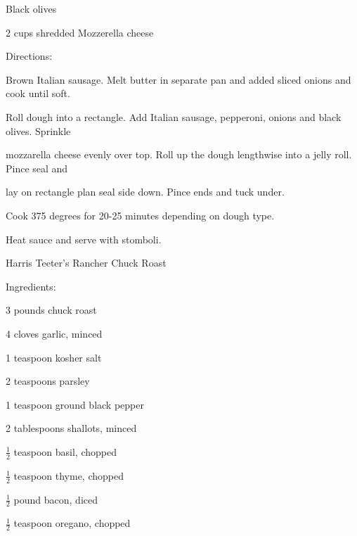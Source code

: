 \documentclass[a4paper,portrait,12pt]{book}
\begin{document}
Black olives




2 cups shredded Mozzerella cheese




Directions:




Brown Italian sausage. Melt butter in separate pan and added sliced onions and cook until soft.




Roll dough into a rectangle. Add Italian sausage, pepperoni, onions and black olives. Sprinkle




mozzarella cheese evenly over top. Roll up the dough lengthwise into a jelly roll. Pince seal and




lay on rectangle plan seal side down. Pince ends and tuck under.




Cook 375 degrees for 20-25 minutes depending on dough type.




Heat sauce and serve with stomboli.






\newpage
Harris Teeter's Rancher Chuck Roast




Ingredients:




3 pounds chuck roast




4 cloves garlic, minced




1 teaspoon kosher salt




2 teaspoons parsley




1 teaspoon ground black pepper




2 tablespoons shallots, minced




$\frac{1}{2}$ teaspoon basil, chopped




$\frac{1}{2}$ teaspoon thyme, chopped




$\frac{1}{2}$ pound bacon, diced




$\frac{1}{2}$ teaspoon oregano, chopped
\end{document}

